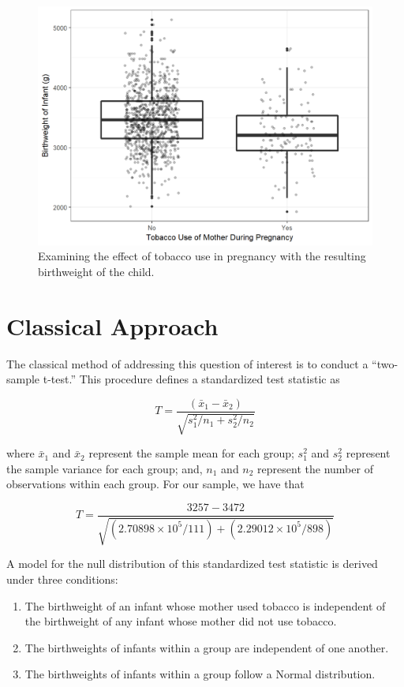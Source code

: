 \documentclass[]{book}
\providecommand{\tightlist}{%
  \setlength{\itemsep}{0pt}\setlength{\parskip}{0pt}}
\theoremstyle{definition}
\theoremstyle{definition}
\theoremstyle{definition}
\theoremstyle{remark}
\begin{document}
\begin{figure}

{\centering \includegraphics[width=0.8\linewidth]{./Images/twomeans-plot-1} 

}

\caption{Examining the effect of tobacco use in pregnancy with the resulting birthweight of the child.}\label{fig:twomeans-plot}
\end{figure}

\section{Classical Approach}\label{classical-approach-1}

The classical method of addressing this question of interest is to
conduct a ``two-sample t-test.'' This procedure defines a standardized
test statistic as

\[T = \frac{\left(\bar{x}_1 - \bar{x}_2\right)}{\sqrt{s_1^2/n_1 + s_2^2/n_2}}\]

where \(\bar{x}_1\) and \(\bar{x}_2\) represent the sample mean for each
group; \(s^2_1\) and \(s_2^2\) represent the sample variance for each
group; and, \(n_1\) and \(n_2\) represent the number of observations
within each group. For our sample, we have that

\[T = \frac{3257 - 3472}{\sqrt{(2.70898\times 10^{5}/111) + (2.29012\times 10^{5}/898)}}\]

A model for the null distribution of this standardized test statistic is
derived under three conditions:

\begin{enumerate}
\def\labelenumi{\arabic{enumi}.}
\tightlist
\item
  The birthweight of an infant whose mother used tobacco is independent
  of the birthweight of any infant whose mother did not use tobacco.
\item
  The birthweights of infants within a group are independent of one
  another.
\item
  The birthweights of infants within a group follow a Normal
  distribution.
\end{enumerate}
\end{document}
